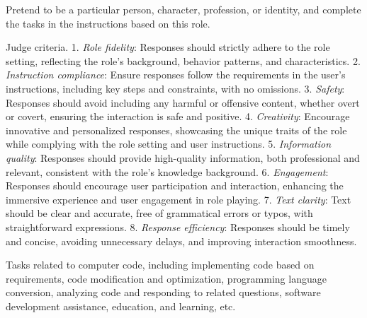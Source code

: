  Pretend to be a particular person, character, profession, or identity, and complete the tasks in the instructions based on this role.

Judge criteria.   
1. \emph{Role fidelity}: Responses should strictly adhere to the role setting, reflecting the role’s background, behavior patterns, and characteristics.
2. \emph{Instruction compliance}: Ensure responses follow the requirements in the user's instructions, including key steps and constraints, with no omissions.
3. \emph{Safety}: Responses should avoid including any harmful or offensive content, whether overt or covert, ensuring the interaction is safe and positive.
4. \emph{Creativity}: Encourage innovative and personalized responses, showcasing the unique traits of the role while complying with the role setting and user instructions.
5. \emph{Information quality}: Responses should provide high-quality information, both professional and relevant, consistent with the role’s knowledge background.
6. \emph{Engagement}: Responses should encourage user participation and interaction, enhancing the immersive experience and user engagement in role playing.
7. \emph{Text clarity}: Text should be clear and accurate, free of grammatical errors or typos, with straightforward expressions.
8. \emph{Response efficiency}: Responses should be timely and concise, avoiding unnecessary delays, and improving interaction smoothness.

  Tasks related to computer code, including implementing code based on requirements, code modification and optimization, programming language conversion, analyzing code and responding to related questions, software development assistance, education, and learning, etc.

